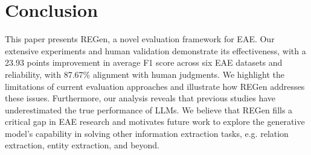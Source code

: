 \section{Conclusion}
This paper presents REGen, a novel evaluation framework for EAE. Our extensive experiments and human validation demonstrate its effectiveness, with a 23.93 points improvement in average F1 score across six EAE datasets and reliability, with 87.67\% alignment with human judgments. We highlight the limitations of current evaluation approaches and illustrate how REGen addresses these issues. Furthermore, our analysis reveals that previous studies have underestimated the true performance of LLMs. We believe that REGen fills a critical gap in EAE research and motivates future work to explore the generative model's capability in solving other information extraction tasks, e.g. relation extraction, entity extraction, and beyond.
